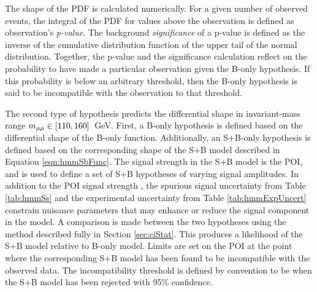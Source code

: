 The shape of the PDF is calculated numerically.
For a given number of observed events, the integral of the PDF for values above the observation is defined as observation's \emph{p-value}.
The background \emph{significance} of a p-value is defined as the inverse of the cumulative distribution function of the upper tail of the normal distribution.
Together, the p-value and the significance calculation reflect on the probability to have made a particular observation given the B-only hypothesis.
If this probability is below an arbitrary threshold, then the B-only hypothesis is said to be incompatible with the observation to that threshold.

The second type of hypothesis predicts the differential \muu shape in invariant-mass range $m_{\mu\mu}\in[110,160]$~GeV.
First, a B-only hypothesis is defined based on the differential shape of the B-only function.
Additionally, an S+B-only hypothesis is defined based on the corresponding shape of the S+B model described in Equation \ref{eqn:hmmSbFunc}.
The signal strength \mus in the S+B model is the POI, and is used to define a set of S+B hypotheses of varying signal amplitudes.
In addition to the POI signal strength \mus, the spurious signal uncertainty from Table \ref{tab:hmmSs} and the experimental uncertainty from Table \ref{tab:hmmExpUncert} constrain nuisance parameters that may enhance or reduce the signal component in the model.
A comparison is made between the two hypotheses using the \cls method described fully in Section \ref{sec:ciStat}.
This produces a likelihood of the S+B model relative to B-only model.
Limits are set on the POI at the point where the corresponding S+B model has been found to be incompatible with the observed data.
The incompatibility threshold is defined by convention to be when the S+B model has been rejected with 95\% confidence.  

